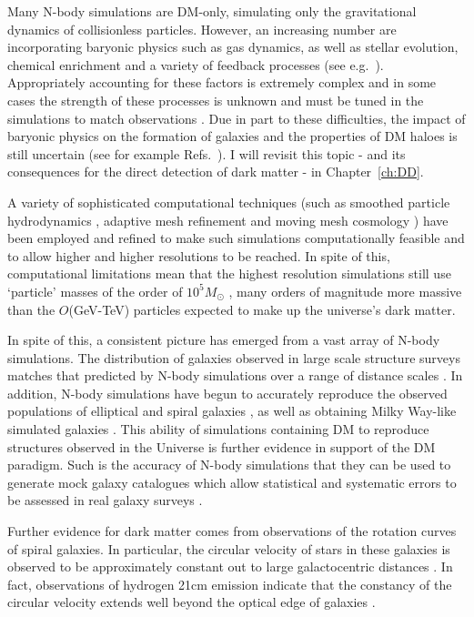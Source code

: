 Many N-body simulations are DM-only, simulating only the gravitational dynamics of collisionless particles. However, an increasing number are incorporating baryonic physics such as gas dynamics, as well as stellar evolution, chemical enrichment and a variety of feedback processes (see e.g.~\cite{Mollitor:2014,Vogelsberger:2014}). Appropriately accounting for these factors is extremely complex and in some cases the strength of these processes is unknown and must be tuned in the simulations to match observations \cite{Vogelsberger:2013}. Due in part to these difficulties, the impact of baryonic physics on the formation of galaxies and the properties of DM haloes is still uncertain (see for example Refs.~\cite{Martizzi:2012,Pillepich:2014}). I will revisit this topic - and its consequences for the direct detection of dark matter - in Chapter~\ref{ch:DD}.

A variety of sophisticated computational techniques (such as smoothed particle hydrodynamics \cite{Stinson:2010}, adaptive mesh refinement \cite{Norman:1999} and moving mesh cosmology \cite{Springel:2010}) have been employed and refined to make such simulations computationally feasible and to allow higher and higher resolutions to be reached. In spite of this, computational limitations mean that the highest resolution simulations still use `particle' masses of the order of $10^5 M_{\odot}$ \cite{Pillepich:2014}, many orders of magnitude more massive than the $O$(GeV-TeV) particles expected to make up the universe's dark matter.

In spite of this, a consistent picture has emerged from a vast array of N-body simulations. The distribution of galaxies observed in large scale structure surveys matches that predicted by N-body simulations over a range of distance scales \cite{Springel:2005}. In addition, N-body simulations have begun to accurately reproduce the observed populations of elliptical and spiral galaxies \cite{Vogelsberger:2014}, as well as obtaining Milky Way-like simulated galaxies \cite{Mollitor:2014}. This ability of simulations containing DM to reproduce structures observed in the Universe is further evidence in support of the DM paradigm. Such is the accuracy of N-body simulations that they can be used to generate mock galaxy catalogues which allow statistical and systematic errors to be assessed in real galaxy surveys \cite{Lemson:2006}.



Further evidence for dark matter comes from observations of the rotation curves of spiral galaxies. In particular, the circular velocity of stars in these galaxies is observed to be approximately constant out to large galactocentric distances \cite{Begeman:1991,Persic:1996}. In fact, observations of hydrogen 21cm emission indicate that the constancy of the circular velocity extends well beyond the optical edge of galaxies \cite{Bosma:1981a, Bosma:1981b}.

